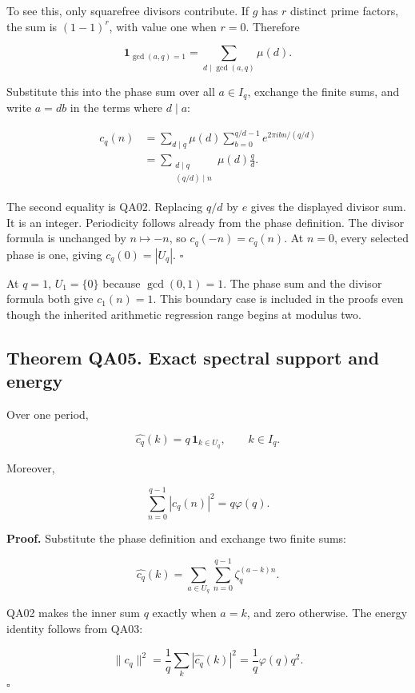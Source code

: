 To see this, only squarefree divisors contribute. If \(g\) has \(r\)
distinct prime factors, the sum is \((1-1)^r\), with value one when
\(r=0\). Therefore

\[
\mathbf1_{\gcd(a,q)=1}=\sum_{d\mid\gcd(a,q)}\mu(d).
\]

Substitute this into the phase sum over all \(a\in I_q\), exchange the
finite sums, and write \(a=db\) in the terms where \(d\mid a\):

\[
\begin{aligned}
c_q(n)
&=\sum_{d\mid q}\mu(d)
  \sum_{b=0}^{q/d-1}e^{2\pi ibn/(q/d)}\\
&=\sum_{\substack{d\mid q\\(q/d)\mid n}}\mu(d)\frac qd.
\end{aligned}
\]

The second equality is QA02. Replacing \(q/d\) by \(e\) gives the
displayed divisor sum. It is an integer. Periodicity follows already
from the phase definition. The divisor formula is unchanged by
\(n\mapsto -n\), so \(c_q(-n)=c_q(n)\). At \(n=0\), every selected phase
is one, giving \(c_q(0)=|U_q|\). \(\square\)

At \(q=1\), \(U_1=\{0\}\) because \(\gcd(0,1)=1\). The phase sum and the
divisor formula both give \(c_1(n)=1\). This boundary case is included
in the proofs even though the inherited arithmetic regression range
begins at modulus two.

\hypertarget{theorem-qa05.-exact-spectral-support-and-energy}{%
\subsection*{Theorem QA05. Exact spectral support and
energy}\label{theorem-qa05.-exact-spectral-support-and-energy}}

Over one period,

\[
\boxed{\widehat{c_q}(k)=q\,\mathbf1_{k\in U_q},\qquad k\in I_q.}
\]

Moreover,

\[
\sum_{n=0}^{q-1}|c_q(n)|^2=q\varphi(q).
\]

\textbf{Proof.} Substitute the phase definition and exchange two finite
sums:

\[
\widehat{c_q}(k)
=\sum_{a\in U_q}\sum_{n=0}^{q-1}\zeta_q^{(a-k)n}.
\]

QA02 makes the inner sum \(q\) exactly when \(a=k\), and zero otherwise.
The energy identity follows from QA03:

\[
\|c_q\|^2
=\frac1q\sum_k|\widehat{c_q}(k)|^2
=\frac1q\varphi(q)q^2.
\] \(\square\)


